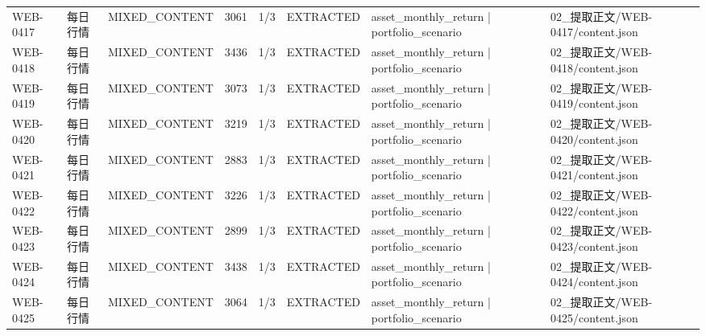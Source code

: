 \begin{landscape}
\begin{longtable}{p{1.8cm}p{4.2cm}p{3.0cm}p{1.4cm}p{1.6cm}p{2.4cm}p{4.2cm}p{4.2cm}}
WEB-0417 & 每日行情 & MIXED\_\allowbreak{}CONTENT & 3061 & 1/\allowbreak{}3 & EXTRACTED & asset\_\allowbreak{}monthly\_\allowbreak{}return | portfolio\_\allowbreak{}scenario & 02\_\allowbreak{}提取正文/\allowbreak{}WEB-0417/\allowbreak{}content.json\\
WEB-0418 & 每日行情 & MIXED\_\allowbreak{}CONTENT & 3436 & 1/\allowbreak{}3 & EXTRACTED & asset\_\allowbreak{}monthly\_\allowbreak{}return | portfolio\_\allowbreak{}scenario & 02\_\allowbreak{}提取正文/\allowbreak{}WEB-0418/\allowbreak{}content.json\\
WEB-0419 & 每日行情 & MIXED\_\allowbreak{}CONTENT & 3073 & 1/\allowbreak{}3 & EXTRACTED & asset\_\allowbreak{}monthly\_\allowbreak{}return | portfolio\_\allowbreak{}scenario & 02\_\allowbreak{}提取正文/\allowbreak{}WEB-0419/\allowbreak{}content.json\\
WEB-0420 & 每日行情 & MIXED\_\allowbreak{}CONTENT & 3219 & 1/\allowbreak{}3 & EXTRACTED & asset\_\allowbreak{}monthly\_\allowbreak{}return | portfolio\_\allowbreak{}scenario & 02\_\allowbreak{}提取正文/\allowbreak{}WEB-0420/\allowbreak{}content.json\\
WEB-0421 & 每日行情 & MIXED\_\allowbreak{}CONTENT & 2883 & 1/\allowbreak{}3 & EXTRACTED & asset\_\allowbreak{}monthly\_\allowbreak{}return | portfolio\_\allowbreak{}scenario & 02\_\allowbreak{}提取正文/\allowbreak{}WEB-0421/\allowbreak{}content.json\\
WEB-0422 & 每日行情 & MIXED\_\allowbreak{}CONTENT & 3226 & 1/\allowbreak{}3 & EXTRACTED & asset\_\allowbreak{}monthly\_\allowbreak{}return | portfolio\_\allowbreak{}scenario & 02\_\allowbreak{}提取正文/\allowbreak{}WEB-0422/\allowbreak{}content.json\\
WEB-0423 & 每日行情 & MIXED\_\allowbreak{}CONTENT & 2899 & 1/\allowbreak{}3 & EXTRACTED & asset\_\allowbreak{}monthly\_\allowbreak{}return | portfolio\_\allowbreak{}scenario & 02\_\allowbreak{}提取正文/\allowbreak{}WEB-0423/\allowbreak{}content.json\\
WEB-0424 & 每日行情 & MIXED\_\allowbreak{}CONTENT & 3438 & 1/\allowbreak{}3 & EXTRACTED & asset\_\allowbreak{}monthly\_\allowbreak{}return | portfolio\_\allowbreak{}scenario & 02\_\allowbreak{}提取正文/\allowbreak{}WEB-0424/\allowbreak{}content.json\\
WEB-0425 & 每日行情 & MIXED\_\allowbreak{}CONTENT & 3064 & 1/\allowbreak{}3 & EXTRACTED & asset\_\allowbreak{}monthly\_\allowbreak{}return | portfolio\_\allowbreak{}scenario & 02\_\allowbreak{}提取正文/\allowbreak{}WEB-0425/\allowbreak{}content.json\\

\end{longtable}
\end{landscape}

